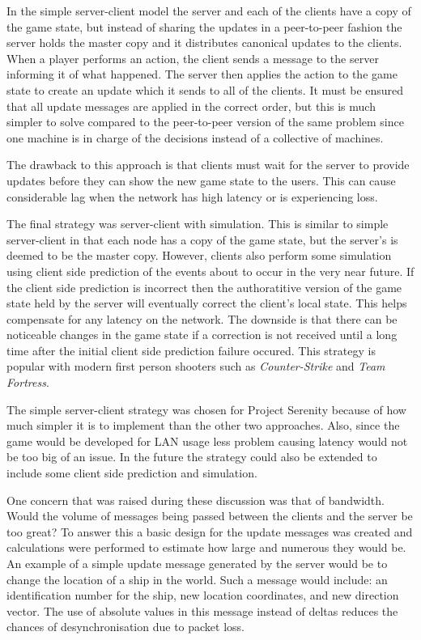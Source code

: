 In the simple server-client model the server and each of the clients have a copy of the game state, but instead of sharing the updates in a peer-to-peer fashion the server holds the master copy and it distributes canonical updates to the clients. When a player performs an action, the client sends a message to the server informing it of what happened. The server then applies the action to the game state to create an update which it sends to all of the clients. It must be ensured that all update messages are applied in the correct order, but this is much simpler to solve compared to the peer-to-peer version of the same problem since one machine is in charge of the decisions instead of a collective of machines.

The drawback to this approach is that clients must wait for the server to provide updates before they can show the new game state to the users. This can cause considerable lag when the network has high latency or is experiencing loss.

The final strategy was server-client with simulation. This is similar to simple server-client in that each node has a copy of the game state, but the server's is deemed to be the master copy. However, clients also perform some simulation using client side prediction of the events about to occur in the very near future. If the client side prediction is incorrect then the authoratitive version of the game state held by the server will eventually correct the client's local state. This helps compensate for any latency on the network. The downside is that there can be noticeable changes in the game state if a correction is not received until a long time after the initial client side prediction failure occured. This strategy is popular with modern first person shooters such as \emph{Counter-Strike} and \emph{Team Fortress}.\cite{bernier2001simulation}

The simple server-client strategy was chosen for Project Serenity because of how much simpler it is to implement than the other two approaches. Also, since the game would be developed for LAN usage less problem causing latency would not be too big of an issue. In the future the strategy could also be extended to include some client side prediction and simulation.

One concern that was raised during these discussion was that of bandwidth. Would the volume of messages being passed between the clients and the server be too great? To answer this a basic design for the update messages was created and calculations were performed to estimate how large and numerous they would be. An example of a simple update message generated by the server would be to change the location of a ship in the world. Such a message would include: an identification number for the ship, new location coordinates, and new direction vector. The use of absolute values in this message instead of deltas reduces the chances of desynchronisation due to packet loss.

